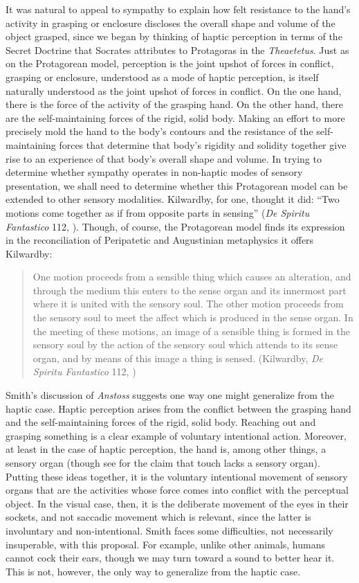 It was natural to appeal to sympathy to explain how felt resistance to the hand's activity in grasping or enclosure discloses the overall shape and volume of the object grasped, since we began by thinking of haptic perception in terms of the Secret Doctrine that Socrates attributes to Protagoras in the \emph{Theaetetus}. Just as on the Protagorean model, perception is the joint upshot of forces in conflict, grasping or enclosure, understood as a mode of haptic perception, is itself naturally understood as the joint upshot of forces in conflict. On the one hand, there is the force of the activity of the grasping hand. On the other hand, there are the self-maintaining forces of the rigid, solid body. Making an effort to more precisely mold the hand to the body's contours and the resistance of the self-maintaining forces that determine that body's rigidity and solidity together give rise to an experience of that body's overall shape and volume. In trying to determine whether sympathy operates in non-haptic modes of sensory presentation, we shall need to determine whether this Protagorean model can be extended to other sensory modalities. Kilwardby, for one, thought it did: ``Two motions come together as if from opposite parts in sensing'' (\emph{De Spiritu Fantastico} 112, \citealt[]{Broadie:1993dz}). Though, of course, the Protagorean model finds its expression in the reconciliation of Peripatetic and Augustinian metaphysics it offers Kilwardby:
\begin{quote}
	One motion proceeds from a sensible thing which causes an alteration, and through the medium this enters to the sense organ and its innermost part where it is united with the sensory soul. The other motion proceeds from the sensory soul to meet the affect which is produced in the sense organ. In the meeting of these motions, an image of a sensible thing is formed in the sensory soul by the action of the sensory soul which attends to its sense organ, and by means of this image a thing is sensed. (Kilwardby, \emph{De Spiritu Fantastico} 112, \citealt[]{Broadie:1993dz})
\end{quote}

Smith's \citeyearpar{Smith:2002sa} discussion of \emph{Anstoss} suggests one way one might generalize from the haptic case. Haptic perception arises from the conflict between the grasping hand and the self-maintaining forces of the rigid, solid body. Reaching out and grasping something is a clear example of voluntary intentional action. Moreover, at least in the case of haptic perception, the hand is, among other things, a sensory organ (though see \citealt{Paterson:2007aa} for the claim that touch lacks a sensory organ). Putting these ideas together, it is the voluntary intentional movement of sensory organs that are the activities whose force comes into conflict with the perceptual object. In the visual case, then, it is the deliberate movement of the eyes in their sockets, and not saccadic movement which is relevant, since the latter is involuntary and non-intentional. Smith faces some difficulties, not necessarily insuperable, with this proposal. For example, unlike other animals, humans cannot cock their ears, though we may turn toward a sound to better hear it. This is not, however, the only way to generalize from the haptic case. 

